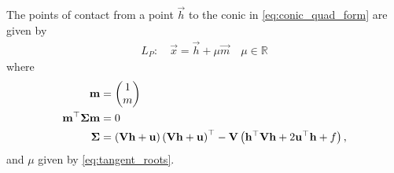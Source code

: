 \documentclass[journal,12pt,onecolumn]{IEEEtran}
\begin{document}
\begin{theorem}
	The points of contact from a point $\vec{h}$ to the conic in \eqref{eq:conic_quad_form}
	are given by 
\begin{align}
L_P: \quad \vec{x} = \vec{h} + \mu \vec{m} \quad \mu \in \mathbb{R}
\label{eq:conic_tangent-q}
\end{align}
where 
	\begin{align}
  \label{eq:conic_tangent_dirvec-h}
		\mathbf{m} &= \begin{pmatrix}1 \\ m\end{pmatrix}
		\\
\mathbf{m}^{\top}\bm{\Sigma}
		\mathbf{m} &= 0
  \label{eq:conic_tangent_qquad-h}
  \\
		\bm{\Sigma} &= 
	   \left(\mathbf{V}\mathbf{h}+\mathbf{u}\right)
	  \left(\mathbf{V}\mathbf{h}+\mathbf{u}\right)^{\top}
   -\mathbf{V}
  \left(
  \mathbf{h}^{\top}\mathbf{V}\mathbf{h} + 2\mathbf{u}^{\top}\mathbf{h} +f
  \right),
  \end{align}                    
  and $\mu$ given by 
\eqref{eq:tangent_roots}.
\end{theorem}
\end{document}
